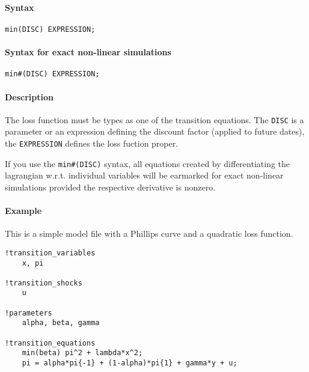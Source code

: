 


	\paragraph{Syntax}\label{syntax}

\begin{verbatim}
min(DISC) EXPRESSION;
\end{verbatim}

\paragraph{Syntax for exact non-linear
simulations}\label{syntax-for-exact-non-linear-simulations}

\begin{verbatim}
min#(DISC) EXPRESSION;
\end{verbatim}

\paragraph{Description}\label{description}

The loss function must be types as one of the transition equations. The
\texttt{DISC} is a parameter or an expression defining the discount
factor (applied to future dates), the \texttt{EXPRESSION} defines the
loss fuction proper.

If you use the \texttt{min\#(DISC)} syntax, all equations created by
differentiating the lagrangian w.r.t. individual variables will be
earmarked for exact non-linear simulations provided the respective
derivative is nonzero.

\paragraph{Example}\label{example}

This is a simple model file with a Phillips curve and a quadratic loss
function.

\begin{verbatim}
!transition_variables
    x, pi

!transition_shocks
    u

!parameters
    alpha, beta, gamma

!transition_equations
    min(beta) pi^2 + lambda*x^2;
    pi = alpha*pi{-1} + (1-alpha)*pi{1} + gamma*y + u;
\end{verbatim}


